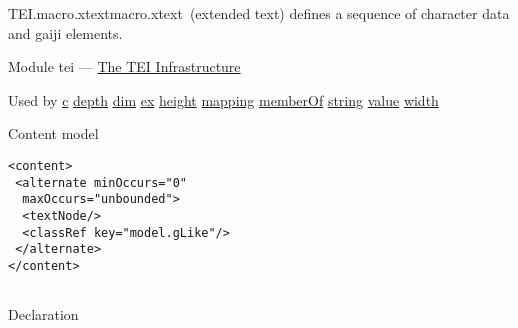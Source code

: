 \begin{reflist}
\item[]\begin{specHead}{TEI.macro.xtext}{macro.xtext} (extended text) defines a sequence of character data and gaiji elements.\end{specHead} 
    \item[{Module}]
  tei — \hyperref[ST]{The TEI Infrastructure}
    \item[{Used by}]
  \hyperref[TEI.c]{c} \hyperref[TEI.depth]{depth} \hyperref[TEI.dim]{dim} \hyperref[TEI.ex]{ex} \hyperref[TEI.height]{height} \hyperref[TEI.mapping]{mapping} \hyperref[TEI.memberOf]{memberOf} \hyperref[TEI.string]{string} \hyperref[TEI.value]{value} \hyperref[TEI.width]{width}
    \item[{Content model}]
  \mbox{}\hfill\\[-10pt]\begin{Verbatim}[fontsize=\small]
<content>
 <alternate minOccurs="0"
  maxOccurs="unbounded">
  <textNode/>
  <classRef key="model.gLike"/>
 </alternate>
</content>
    
\end{Verbatim}

    \item[{Declaration}]
\end{reflist}  
